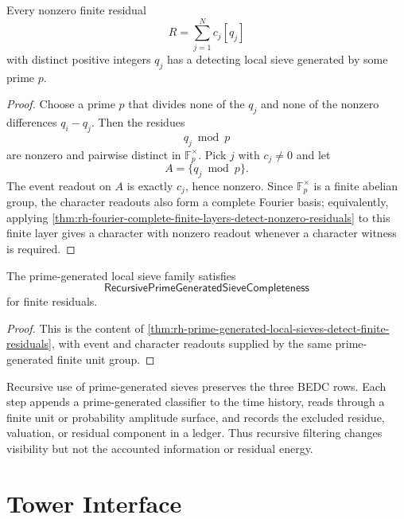 \begin{theorem}
\label{thm:rh-prime-generated-local-sieves-detect-finite-residuals}
Every nonzero finite residual
$$
R=\sum_{j=1}^{N}c_j[q_j]
$$
with distinct positive integers $q_j$ has a detecting local sieve
generated by some prime $p$.
\end{theorem}

\begin{proof}
Choose a prime $p$ that divides none of the $q_j$ and none of the
nonzero differences $q_i-q_j$.  Then the residues
$$
q_j\bmod p
$$
are nonzero and pairwise distinct in $\mathbb F_p^\times$.  Pick
$j$ with $c_j\ne0$ and let
$$
A=\{q_j\bmod p\}.
$$
The event readout on $A$ is exactly $c_j$, hence nonzero.  Since
$\mathbb F_p^\times$ is a finite abelian group, the character readouts
also form a complete Fourier basis; equivalently, applying
\autoref{thm:rh-fourier-complete-finite-layers-detect-nonzero-residuals}
to this finite layer gives a character with nonzero readout whenever a
character witness is required.
\end{proof}

\begin{corollary}
\label{cor:rh-recursive-generated-sieves-supply-finite-residual-detection}
The prime-generated local sieve family satisfies
$$
\mathsf{RecursivePrimeGeneratedSieveCompleteness}
$$
for finite residuals.
\end{corollary}

\begin{proof}
This is the content of
\autoref{thm:rh-prime-generated-local-sieves-detect-finite-residuals},
with event and character readouts supplied by the same prime-generated
finite unit group.
\end{proof}

\begin{principle}
\label{prin:rh-recursive-generated-sieves-bedc-legal}
Recursive use of prime-generated sieves preserves the three BEDC rows.
Each step appends a prime-generated classifier to the time history,
reads through a finite unit or probability amplitude surface, and
records the excluded residue, valuation, or residual component in a
ledger.  Thus recursive filtering changes visibility but not the
accounted information or residual energy.
\end{principle}

\section{Tower Interface}
\label{sec:rh-prime-sieve-tower-interface}

